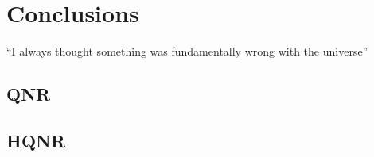 \documentclass[12pt]{report}
\begin{document}
\chapter*{Conclusions}
``I always thought something was fundamentally wrong with the universe'' \cite{criticalComparison}
\newpage




\newpage

\appendix

\begin{spacing}{1}
\section{QNR}
\label{qnr_functions}


\section{HQNR}
\label{hqnr_functions}

\end{spacing}
\end{document}
